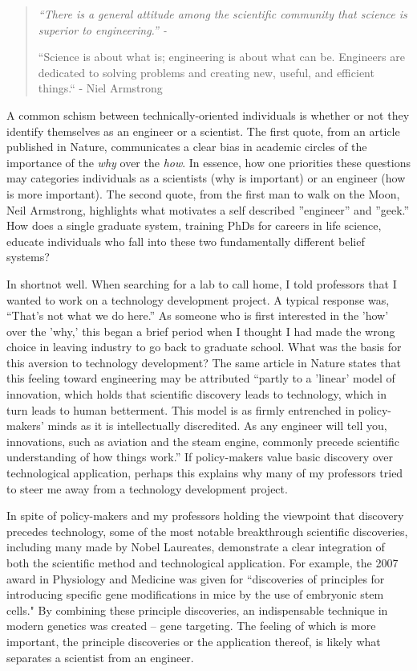 \begin{quote}
	\itshape %
	\singlespacing
	“There is a general attitude among the scientific community that science is superior to engineering.” - \citep{Macilwain2010}

	“Science is about what is; engineering is about what can be. Engineers are dedicated to solving problems and creating new, useful, and efficient things.“ - Niel Armstrong
\end{quote}

A common schism between technically-oriented individuals is whether or not they identify themselves as an engineer or a scientist. The first quote, from an article published in Nature, communicates a clear bias in academic circles of the importance of the \textit{why} over the \textit{how}. In essence, how one priorities these questions may categories individuals as a scientists (why is important) or an engineer (how is more important). The second quote, from the first man to walk on the Moon, Neil Armstrong, highlights what motivates a self described ”engineer” and ”geek.” How does a single graduate system, training PhDs for careers in life science, educate individuals who fall into these two fundamentally different belief systems?

In short\textemdash not well. When searching for a lab to call home, I told professors that I wanted to work on a technology development project. A typical response was, “That's not what we do here.” As someone who is first interested in the 'how' over the 'why,' this began a brief period when I thought I had made the wrong choice in leaving industry to go back to graduate school. What was the basis for this aversion to technology development? The same article in Nature states that this feeling toward engineering may be attributed “partly to a 'linear' model of innovation, which holds that scientific discovery leads to technology, which in turn leads to human betterment.  This model is as firmly entrenched in policy-makers' minds as it is intellectually discredited.  As any engineer will tell you, innovations, such as aviation and the steam engine, commonly precede scientific understanding of how things work.” If policy-makers value basic discovery over technological application, perhaps this explains why many of my professors tried to steer me away from a technology development project.

In spite of policy-makers and my professors holding the viewpoint that discovery precedes technology, some of the most notable breakthrough scientific discoveries, including many made by Nobel Laureates, demonstrate a clear integration of both the scientific method and technological application.  For example, the 2007 award in Physiology and Medicine was given for “discoveries of principles for introducing specific gene modifications in mice by the use of embryonic stem cells."  By combining these principle discoveries, an indispensable technique in modern genetics was created – gene targeting.  The feeling of which is more important, the principle discoveries or the application thereof, is likely what separates a scientist from an engineer. 

